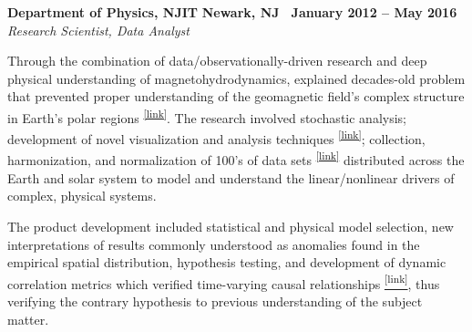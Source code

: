 \documentclass[10pt]{article}
\newcommand{\leftandright}[2]{\noindent\textbf{#1}\hfill
\textbf{#2}}
\begin{document}
\leftandright{Department of Physics, NJIT}{Newark, NJ \textbullet\, January
2012 -- May 2016} \\  
\vspace{-0.8em}
\textit{Research Scientist, Data Analyst} 
\begin{itemize*}
  \item Through the combination of data/observationally-driven research and deep
    physical understanding of magnetohydrodynamics, explained
    decades-old problem that prevented proper understanding of the geomagnetic field's
    complex structure in Earth's polar regions 
    \textsuperscript{\href{http://www.slideshare.net/inverseuniverse/polarcappower}
    {[link]}}. The research involved stochastic analysis; development of
    novel visualization and analysis techniques
    \textsuperscript{\href{http://www.slideshare.net/inverseuniverse/spectralproducts-64254698}{[link]}};
    collection, harmonization, and normalization of 100's of data sets 
    \textsuperscript{\href{http://kevin-urban.com/video/R__20130302_trifecta.mp4}{[link]}}
    distributed across the Earth and solar system to model and
    understand the linear/nonlinear drivers of complex, physical
    systems.
  \item The product development included statistical and physical model
    selection, new interpretations of results commonly understood as
    anomalies found in the empirical spatial distribution, hypothesis
    testing, and development of dynamic correlation metrics which verified 
    time-varying causal relationships 
    \href{http://kevin-urban.com/images/dynamic-correlograms.pdf}
    {\textsuperscript{[link]}}, thus verifying the 
    contrary hypothesis to previous understanding of the subject matter.

\end{itemize*}
\end{document}
